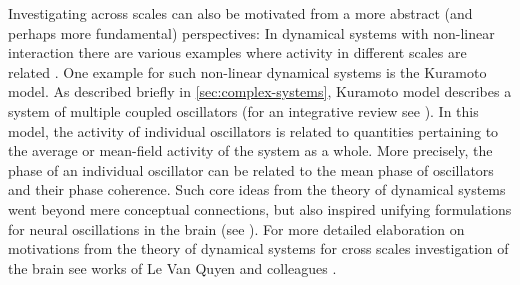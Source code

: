 Investigating across scales can also be motivated from a more abstract 
(and perhaps more fundamental) perspectives:
In dynamical systems with non-linear interaction there are various examples where
activity in different scales are related \cite{levanquyenBrainwebCrossscaleInteractions2011}.
One example for such non-linear dynamical systems is the Kuramoto model.
As described briefly in \autoref{sec:complex-systems},
Kuramoto model describes a system of multiple coupled oscillators
\cite{kuramotoSelfentrainmentPopulationCoupled1975,kuramotoChemicalOscillationsWaves2003} 
(for an integrative review see \cite{acebronKuramotoModelSimple2005}).
In this model, the activity of individual oscillators is related to quantities pertaining to the average or mean-field activity of the system as a whole.
More precisely, the phase of an individual oscillator can be related to the mean phase of oscillators and their phase coherence.
Such core ideas from the theory of dynamical systems went beyond mere conceptual connections,
but also inspired unifying formulations for neural oscillations in the brain (\eg see \cite{breakspearGenerativeModelsCortical2010}).
For more detailed elaboration on motivations from the theory of dynamical systems for cross scales investigation of the brain see works of Le Van Quyen and colleagues
\cite{levanquyenExploringNonlinearDynamics2003,levanquyenDisentanglingDynamicCore00,levanquyenBrainwebCrossscaleInteractions2011}.


